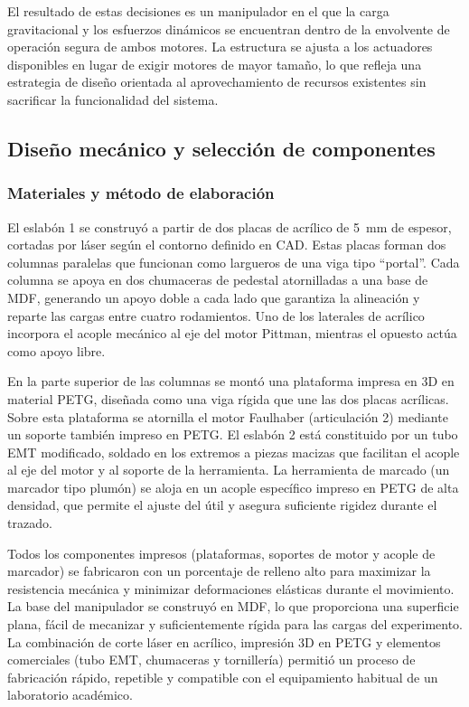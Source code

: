 \documentclass[11pt,a4paper]{article}
\begin{document}
El resultado de estas decisiones es un manipulador en el que la carga gravitacional y los esfuerzos dinámicos se encuentran dentro de la envolvente de operación segura de ambos motores. La estructura se ajusta a los actuadores disponibles en lugar de exigir motores de mayor tamaño, lo que refleja una estrategia de diseño orientada al aprovechamiento de recursos existentes sin sacrificar la funcionalidad del sistema.

\subsection{Diseño mecánico y selección de componentes}

\subsubsection{Materiales y método de elaboración}

El eslabón 1 se construyó a partir de dos placas de acrílico de \SI{5}{\milli\metre} de espesor, cortadas por láser según el contorno definido en CAD. Estas placas forman dos columnas paralelas que funcionan como largueros de una viga tipo ``portal''. Cada columna se apoya en dos chumaceras de pedestal atornilladas a una base de MDF, generando un apoyo doble a cada lado que garantiza la alineación y reparte las cargas entre cuatro rodamientos. Uno de los laterales de acrílico incorpora el acople mecánico al eje del motor Pittman, mientras el opuesto actúa como apoyo libre.

En la parte superior de las columnas se montó una plataforma impresa en 3D en material PETG, diseñada como una viga rígida que une las dos placas acrílicas. Sobre esta plataforma se atornilla el motor Faulhaber (articulación 2) mediante un soporte también impreso en PETG. El eslabón 2 está constituido por un tubo EMT modificado, soldado en los extremos a piezas macizas que facilitan el acople al eje del motor y al soporte de la herramienta. La herramienta de marcado (un marcador tipo plumón) se aloja en un acople específico impreso en PETG de alta densidad, que permite el ajuste del útil y asegura suficiente rigidez durante el trazado.

Todos los componentes impresos (plataformas, soportes de motor y acople de marcador) se fabricaron con un porcentaje de relleno alto para maximizar la resistencia mecánica y minimizar deformaciones elásticas durante el movimiento. La base del manipulador se construyó en MDF, lo que proporciona una superficie plana, fácil de mecanizar y suficientemente rígida para las cargas del experimento. La combinación de corte láser en acrílico, impresión 3D en PETG y elementos comerciales (tubo EMT, chumaceras y tornillería) permitió un proceso de fabricación rápido, repetible y compatible con el equipamiento habitual de un laboratorio académico.
\end{document}
